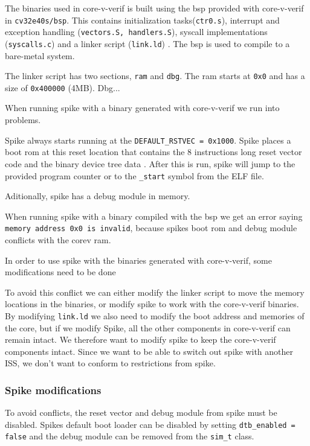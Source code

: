 The binaries used in core-v-verif is built using the \acrfull{bsp} provided with core-v-verif in \lstinline{cv32e40s/bsp}. This contains initialization tasks(\lstinline{ctr0.s}), interrupt and exception handling (\lstinline{vectors.S, handlers.S}), syscall implementations (\lstinline{syscalls.c}) and a linker script (\lstinline{link.ld}) \cite{CorevverifCv32e40sBsp}. The \acrshort{bsp} is used to compile to a bare-metal system.

The linker script has two sections, \lstinline{ram} and \lstinline{dbg}. The ram starts at \lstinline{0x0} and has a size of \lstinline{0x400000} (4MB). Dbg...

When running spike with a binary generated with core-v-verif we run into problems.

Spike always starts running at the \lstinline{DEFAULT_RSTVEC = 0x1000}. Spike places a boot rom at this reset location that contains the 8 instructions long reset vector code and the binary device tree data \cite{evancoxAddDocumentationLowlevel2017}.
After this is run, spike will jump to the provided program counter or to the \lstinline{_start} symbol from the ELF file.

Aditionally, spike has a debug module in memory.

When running spike with a binary compiled with the \acrshort{bsp} we get an error saying \lstinline{memory address 0x0 is invalid}, because spikes boot rom and debug module conflicts with the corev ram. 

In order to use spike with the binaries generated with core-v-verif, some modifications need to be done

To avoid this conflict we can either modify the linker script to move the memory locations in the binaries, or modify spike to work with the core-v-verif binaries. By modifying \lstinline{link.ld} we also need to modify the boot address and memories of the core, but if we modify Spike, all the other components in core-v-verif can remain intact. We therefore want to modify spike to keep the core-v-verif components intact. Since we want to be able to switch out spike with another ISS, we don't want to conform to restrictions from spike.

\subsubsection{Spike modifications}

To avoid conflicts, the reset vector and debug module from spike must be disabled. Spikes default boot loader can be disabled by setting \lstinline{dtb_enabled = false} and the debug module can be removed from the \lstinline{sim_t} class.

